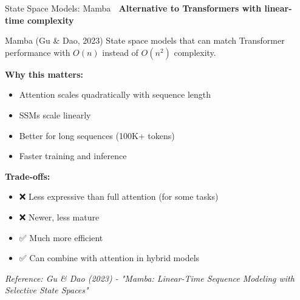 \documentclass[aspectratio=169]{beamer}
\begin{document}
\begin{frame}[shrink=10]{State Space Models: Mamba 🐍}
\textbf{Alternative to Transformers with linear-time complexity}

\vspace{0.5em}

\begin{block}{Mamba (Gu \& Dao, 2023)}
State space models that can match Transformer performance with $O(n)$ instead of $O(n^2)$ complexity.
\end{block}

\vspace{0.5em}

\textbf{Why this matters:}
\begin{itemize}\setlength{\itemsep}{0pt}
    \item Attention scales quadratically with sequence length
    \item SSMs scale linearly
    \item Better for long sequences (100K+ tokens)
    \item Faster training and inference
\end{itemize}

\vspace{0.5em}

\textbf{Trade-offs:}
\begin{itemize}\setlength{\itemsep}{0pt}
    \item ❌ Less expressive than full attention (for some tasks)
    \item ❌ Newer, less mature
    \item ✅ Much more efficient
    \item ✅ Can combine with attention in hybrid models
\end{itemize}

\vspace{0.3em}
\small
\textit{Reference: Gu \& Dao (2023) - "Mamba: Linear-Time Sequence Modeling with Selective State Spaces"}
\end{frame}
\end{document}
